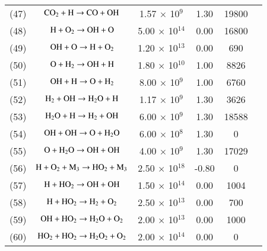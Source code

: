 \documentclass{warpdoc}
\begin{document}
\begin{table}[h]
\begin{center}
\begin{threeparttable}
\begin{tabular}{cccccc}
(47) & $\rm C O_2 + H \rightarrow CO + OH $ &1.57 $\times$ 10$^{9}$  & 1.30 &19800&\cite{rkm:1991:smoke}\\

(48) & $\rm H + O_2 \rightarrow OH +O $ &5.00 $\times$ 10$^{14}$  & 0.00 &16800&\cite{rkm:1991:smoke}\\

(49) & $\rm OH + O \rightarrow H +O_2 $ &1.20 $\times$ 10$^{13}$  & 0.00 &690&\cite{rkm:1991:smoke}\\

(50) & $\rm O + H_2 \rightarrow OH+H $ &1.80 $\times$ 10$^{10}$  & 1.00 &8826&\cite{rkm:1991:smoke}\\

(51) & $\rm OH +H \rightarrow O + H_2 $ &8.00 $\times$ 10$^{9}$  & 1.00 &6760&\cite{rkm:1991:smoke}\\

(52) & $\rm H_2 + OH \rightarrow H_2 O + H  $ &1.17 $\times$ 10$^{9}$  & 1.30 &3626&\cite{rkm:1991:smoke}\\

(53) & $\rm H_2 O + H \rightarrow H_2 +OH  $ &6.00 $\times$ 10$^{9}$  & 1.30 &18588&\cite{rkm:1991:smoke}\\

(54) & $\rm OH+OH \rightarrow O + H_2 O  $ &6.00 $\times$ 10$^{8}$  & 1.30 &0&\cite{rkm:1991:smoke}\\

(55) & $\rm O + H_2 O \rightarrow OH + OH  $ &4.00 $\times$ 10$^{9}$  & 1.30 &17029&\cite{rkm:1991:smoke}\\

(56) & $\rm H + O_2 + M_3 \rightarrow H O_2 + M_3 $ &2.50 $\times$ 10$^{18}$  & -0.80 &0&\cite{rkm:1991:smoke}\tnote{c}\\

(57) & $\rm H + H O_2  \rightarrow OH + OH $ &1.50 $\times$ 10$^{14}$  & 0.00 &1004&\cite{rkm:1991:smoke}\\

(58) & $\rm H + H O_2  \rightarrow H_2 + O_2 $ &2.50 $\times$ 10$^{13}$  &0.00 &700&\cite{rkm:1991:smoke}\\

(59) & $\rm OH + H O_2  \rightarrow H_2 O + O_2 $ &2.00 $\times$ 10$^{13}$  &0.00 &1000&\cite{rkm:1991:smoke}\\

(60) & $\rm H O_2 + H O_2  \rightarrow H_2 O_2 + O_2 $ &2.00 $\times$ 10$^{14}$  &0.00 &0&\cite{rkm:1991:smoke}\\


\end{tabular}
\end{threeparttable}
\end{center}
\end{table}
\end{document}
